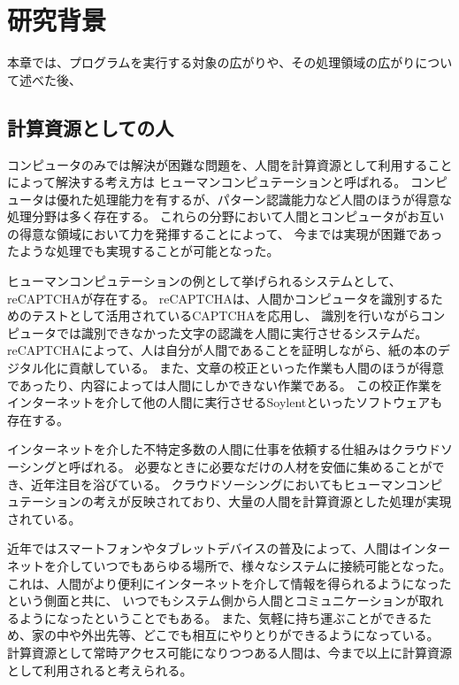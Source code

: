 \chapter{研究背景}\label{chap:background}

本章では、プログラムを実行する対象の広がりや、その処理領域の広がりについて述べた後、

\section{計算資源としての人}\label{ux8a08ux7b97ux8cc7ux6e90ux3068ux3057ux3066ux306eux4eba}

コンピュータのみでは解決が困難な問題を、人間を計算資源として利用することによって解決する考え方は
ヒューマンコンピュテーション\cite{humancomputation}と呼ばれる。
コンピュータは優れた処理能力を有するが、パターン認識能力など人間のほうが得意な処理分野は多く存在する。
これらの分野において人間とコンピュータがお互いの得意な領域において力を発揮することによって、
今までは実現が困難であったような処理でも実現することが可能となった。

ヒューマンコンピュテーションの例として挙げられるシステムとして、reCAPTCHA\cite{recaptcha}が存在する。
reCAPTCHAは、人間かコンピュータを識別するためのテストとして活用されているCAPTCHA\cite{captcha}を応用し、
識別を行いながらコンピュータでは識別できなかった文字の認識を人間に実行させるシステムだ。
reCAPTCHAによって、人は自分が人間であることを証明しながら、紙の本のデジタル化に貢献している。
また、文章の校正といった作業も人間のほうが得意であったり、内容によっては人間にしかできない作業である。
この校正作業をインターネットを介して他の人間に実行させるSoylent\cite{soylent}といったソフトウェアも存在する。

インターネットを介した不特定多数の人間に仕事を依頼する仕組みはクラウドソーシング\cite{riseofcrowdsourcing}と呼ばれる。
必要なときに必要なだけの人材を安価に集めることができ、近年注目を浴びている。
クラウドソーシングにおいてもヒューマンコンピュテーションの考えが反映されており、大量の人間を計算資源とした処理が実現されている。

近年ではスマートフォンやタブレットデバイスの普及によって、人間はインターネットを介していつでもあらゆる場所で、様々なシステムに接続可能となった。
これは、人間がより便利にインターネットを介して情報を得られるようになったという側面と共に、
いつでもシステム側から人間とコミュニケーションが取れるようになったということでもある。
また、気軽に持ち運ぶことができるため、家の中や外出先等、どこでも相互にやりとりができるようになっている。
計算資源として常時アクセス可能になりつつある人間は、今まで以上に計算資源として利用されると考えられる。

